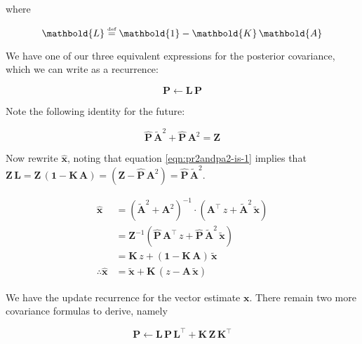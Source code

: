 \documentclass[10pt,oneside,x11names]{article}
\begin{document}
\noindent where

\begin{equation}
\label{eqn:definition-of-l}
\mathbold{L}\stackrel{\text{\tiny def}}{=}
\mathbold{1}-
\mathbold{K}\,
\mathbold{A}
\end{equation}

We have
one of our three equivalent expressions for the posterior covariance, which we
can write as a recurrence:

\begin{equation}
{{\mathbold{P}}} \leftarrow
\mathbold{L}\,
{{\mathbold{P}}}
\end{equation}


\noindent Note the following identity for the future:

\begin{equation}
\label{eqn:pr2andpa2-is-1}
{\hat{\mathbold{P}}}\,
{\tilde{\mathbold{A}}}^2+
{\hat{\mathbold{P}}}\,
{\mathbold{A}}^2 = \mathbold{Z}
\end{equation}

\noindent Now rewrite \({\hat{\mathbold{x}}}\),  noting that
equation \ref{eqn:pr2andpa2-is-1} implies that 
\(\mathbold{Z}\,
\mathbold{L}
=
\mathbold{Z}\,
(
\mathbold{1}-
\mathbold{K}\,
\mathbold{A}
)=
(
\mathbold{Z}-
{\hat{\mathbold{P}}}\,
\mathbold{A}^2
)=
{\hat{\mathbold{P}}}\,
{\tilde{\mathbold{A}}}^2\).

\begin{align*}
\hat{\mathbold{x}}
&=
\left(
{\tilde{\mathbold{A}}}^2 + \mathbold{A}^2
\right)
^{-1}
\cdot
\left(
\mathbold{A}^\intercal\,
z +
{\tilde{\mathbold{A}}}^2\,
{\tilde{\mathbold{x}}}
\right)
\\
&=
\mathbold{Z}^{-1}
\left(
{\hat{\mathbold{P}}}\,
\mathbold{A}^\intercal\,
z +
{\hat{\mathbold{P}}}\,
{\tilde{\mathbold{A}}}^2\,
{\tilde{\mathbold{x}}}
\right)
\\
&=
\mathbold{K}\,
z +
\left(
\mathbold{1} -
\mathbold{K}\,
\mathbold{A}
\right)\,
{\tilde{\mathbold{x}}}
\\
\therefore
\hat{\mathbold{x}}
&=
\tilde{\mathbold{x}}
+
\mathbold{K}\,
\left(
z-
\mathbold{A}\,
\tilde{\mathbold{x}}
\right)
\end{align*}

We have the update recurrence for the vector estimate \(\mathbold{x}\). There remain
two more covariance formulas to derive, namely

\begin{equation}
\label{eqn:p-is-lplt-plus-kzkt}
\mathbold{P}\leftarrow
\mathbold{L}\,
\mathbold{P}\,
\mathbold{L}^\intercal +
\mathbold{K}\,
\mathbold{Z}\,
\mathbold{K}^\intercal
\end{equation}
\end{document}
